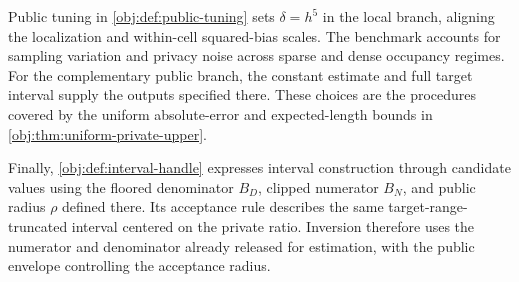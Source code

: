 Public tuning in \cref{obj:def:public-tuning} sets \(\delta=h^5\) in the local branch, aligning the localization and within-cell squared-bias scales. The benchmark accounts for sampling variation and privacy noise across sparse and dense occupancy regimes. For the complementary public branch, the constant estimate and full target interval supply the outputs specified there. These choices are the procedures covered by the uniform absolute-error and expected-length bounds in \cref{obj:thm:uniform-private-upper}.

Finally, \cref{obj:def:interval-handle} expresses interval construction through candidate values using the floored denominator \(B_D\), clipped numerator \(B_N\), and public radius \(\rho\) defined there. Its acceptance rule describes the same target-range-truncated interval centered on the private ratio. Inversion therefore uses the numerator and denominator already released for estimation, with the public envelope controlling the acceptance radius.
